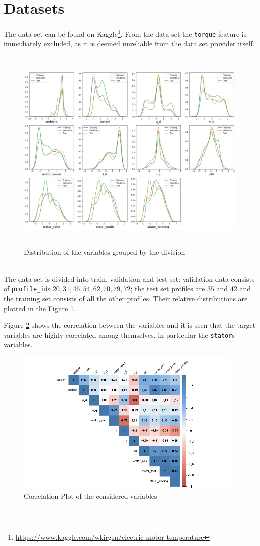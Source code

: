 \section{Datasets}
The data set can be found on Kaggle\footnote{\href{https://www.kaggle.com/wkirgsn/electric-motor-temperature}{https://www.kaggle.com/wkirgsn/electric-motor-temperature}}. From the data set the \verb|torque| feature is immediately excluded, as it is deemed unreliable from the data set provider itself.
\begin{figure}[!h]
    \centering
    \includegraphics[width=\linewidth, height=10cm]{imgs/dist_plot.png}
    \caption{Distribution of the variables grouped by the division}
    \label{fig:dist_plot}
\end{figure}\\
The data set is divided into train, validation and test set: validation data consists of \verb|profile_id|s $20, 31, 46, 54, 62, 70, 79, 72$; the test set profiles are $35$ and $42$ and the training set consists of all the other profiles. Their relative distributions are plotted in the Figure \ref{fig:dist_plot}.

Figure \ref{fig:corrplot} shows the correlation between the variables and it is seen that the target variables are highly correlated among themselves, in particular the \verb|stator|s variables.
\begin{figure}[!h]
    \centering
    \includegraphics[width=\linewidth, height=7cm]{imgs/corrplot.png}
    \caption{Correlation Plot of the considered variables}
    \label{fig:corrplot}
\end{figure}\\

